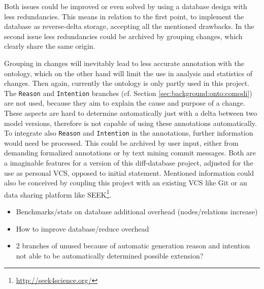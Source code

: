 Both issues could be improved or even solved by using a database design with less redundancies. This means in relation to the first point, to implement the database as reverse-delta storage, accepting all the mentioned drawbacks.
In the second issue less redundancies could be archived by grouping changes, which clearly share the same origin.

Grouping in changes will inevitably lead to less accurate annotation with the \comodi ontology, which on the other hand will limit the use in analysis and statistics of changes. 
Then again, currently the \comodi ontology is only partly used in this project. The \texttt{Reason} and \texttt{Intention} branches (cf. Section \ref{sec:background:onto:comodi}) are not used, because they aim to explain the cause and purpose of a change. These aspects are hard to determine automatically just with a delta between two model versions, therefore is \bives not capable of using these annotations automatically.
To integrate also \texttt{Reason} and \texttt{Intention} in the annotations, further information would need be processed. This could be archived by user input, either from demanding formalized annotations or by text mining commit messages. 
Both are a imaginable features for a version of this diff-database project, adjusted for the use as personal VCS, opposed to initial statement.
Mentioned information could also be conceived by coupling this project with an existing VCS like Git or an data sharing platform like SEEK\footnote{\url{http://seek4science.org/}}.


\begin{itemize}
	\item Benchmarks/stats on database
		\subitem additional overhead (nodes/relations increase)
	\item How to improve database/reduce overhead
	\item 2 branches of \comodi unused
		\subitem because of automatic generation
		\subitem reason and intention not able to be automatically determined
		\subitem possible extension?
\end{itemize}
